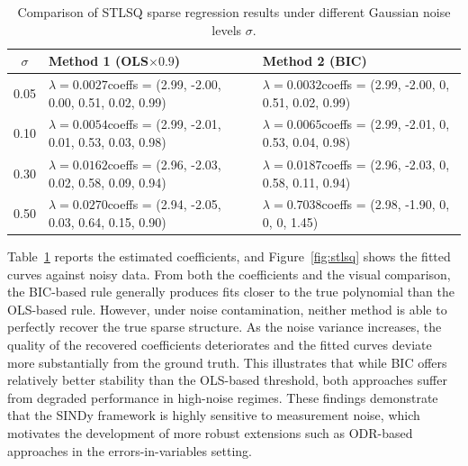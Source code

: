 \begin{table}[htbp]
\centering
\caption{Comparison of STLSQ sparse regression results under different Gaussian noise levels $\sigma$.}
\label{tab:stlsq_noise}
\scriptsize
\begin{tabular}{c p{6cm} p{6cm}}
\toprule
$\sigma$ & Method 1 (OLS$\times 0.9$) & Method 2 (BIC) \\
\midrule
0.05 & $\lambda=0.0027$\newline coeffs = (2.99, -2.00, 0.00, 0.51, 0.02, 0.99) 
      & $\lambda=0.0032$\newline coeffs = (2.99, -2.00, 0, 0.51, 0.02, 0.99) \\
\midrule
0.10 & $\lambda=0.0054$\newline coeffs = (2.99, -2.01, 0.01, 0.53, 0.03, 0.98) 
      & $\lambda=0.0065$\newline coeffs = (2.99, -2.01, 0, 0.53, 0.04, 0.98) \\
\midrule
0.30 & $\lambda=0.0162$\newline coeffs = (2.96, -2.03, 0.02, 0.58, 0.09, 0.94) 
      & $\lambda=0.0187$\newline coeffs = (2.96, -2.03, 0, 0.58, 0.11, 0.94) \\
\midrule
0.50 & $\lambda=0.0270$\newline coeffs = (2.94, -2.05, 0.03, 0.64, 0.15, 0.90) 
      & $\lambda=0.7038$\newline coeffs = (2.98, -1.90, 0, 0, 0, 1.45) \\
\bottomrule
\end{tabular}
\end{table}


Table~\ref{tab:stlsq_noise} reports the estimated coefficients, and Figure~\ref{fig:stlsq} shows the fitted curves against noisy data. From both the coefficients and the visual comparison, the BIC-based rule generally produces fits closer to the true polynomial than the OLS-based rule. However, under noise contamination, neither method is able to perfectly recover the true sparse structure. As the noise variance increases, the quality of the recovered coefficients deteriorates and the fitted curves deviate more substantially from the ground truth. This illustrates that while BIC offers relatively better stability than the OLS-based threshold, both approaches suffer from degraded performance in high-noise regimes. These findings demonstrate that the SINDy framework is highly sensitive to measurement noise, which motivates the development of more robust extensions such as ODR-based approaches in the errors-in-variables setting.





